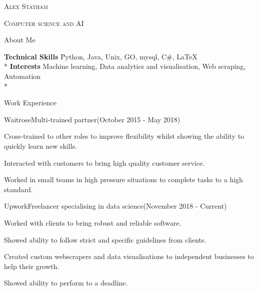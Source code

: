 \documentclass[]{article}
\newlength{\tabin}
\newlength{\secsep}
\newcommand{\lineunder}{\vspace*{-8pt} \\ \hspace*{-6pt} \hrulefill \\ \vspace*{-15pt}}
\newcommand{\name}[1]{\begin{center}\textsc{\Huge#1}\\\end{center}}
\newcommand{\program}[1]{\begin{center}\textsc{#1}\end{center}}
\newcommand{\contact}[1]{\begin{center}\color{contactgray}{\small#1}\end{center}}
\newcommand{\contactnumber}[1]{\begin{center}\color{contactgray}{\small#1}\end{center}}
\newenvironment{tabbedsection}[1]{
  \begin{list}{}{
      \setlength{\itemsep}{0pt}
      \setlength{\labelsep}{0pt}
      \setlength{\labelwidth}{0pt}
      \setlength{\leftmargin}{\tabin}
      \setlength{\rightmargin}{\tabin}
      \setlength{\listparindent}{0pt}
      \setlength{\parsep}{0pt}
      \setlength{\parskip}{0pt}
      \setlength{\partopsep}{0pt}
      \setlength{\topsep}{#1}
    }
  \item[]
}{\end{list}}
\newenvironment{nospacetabbing}{
    \begin{tabbing}
}{\end{tabbing}\vspace{-1.2em}}
\newenvironment{resume_header}{}{\vspace{0pt}}
\newenvironment{resume_section}[1]{
  \filbreak
  \vspace{2\secsep}
  \textsc{\large#1}
  \lineunder
  \begin{tabbedsection}{\secsep}
}{\end{tabbedsection}}
\newenvironment{subitems}{
  \renewcommand{\labelitemi}{-}
  \begin{itemize}
      \setlength{\labelsep}{1em}
}{\end{itemize}}
\newenvironment{resume_employer}[4]{
  \vspace{\secsep}
  \textbf{#1} \\ 
  \indent {\small #2} \hfill {\footnotesize#3 (#4)}
  \begin{tabbedsection}{0pt}
  \begin{subitems}
}{\end{subitems}\end{tabbedsection}}
\begin{document}
\begin{resume_header}
\name{Alex Statham}
\program{Computer science and AI}
\contact{alex.staham1998@gmail.com}
\contactnumber{+447490973388         astatham.com}     
\end{resume_header}

\begin{resume_section}{About Me}
  \begin{nospacetabbing}

  \textbf{Technical Skills}  \= Python, Java, Unix, GO, mysql, C#,  \LaTeX\\*
  \textbf{Interests} \> Machine learning,  Data analytics and visualisation,  Web scraping, Automation \\*
  \end{nospacetabbing}

\end{resume_section}

\begin{resume_section}{Work Experience}
	\begin{resume_employer}{Waitrose}{Multi-trained partner}{(October 2015 - May 2018)}{}
    \item Cross-trained to other roles to improve flexibility whilst showing the ability to quickly learn new skills.
    \item Interacted with customers to bring high quality customer service.
    \item Worked in small teams in high pressure situations to complete tasks to a high standard.
  \end{resume_employer}
  
  \begin{resume_employer}{Upwork}{Freelancer specialising in data science}{(November 2018 - Current)}{}
    \item Worked with clients to bring robust and reliable software.
    \item Showed ability to follow strict and specific guidelines from clients.
    \item Created custom webscrapers and data visualisations to independent businesses to help their growth.
    \item Showed ability to perform to a deadline.
  \end{resume_employer}
\end{resume_section}
\end{document}
